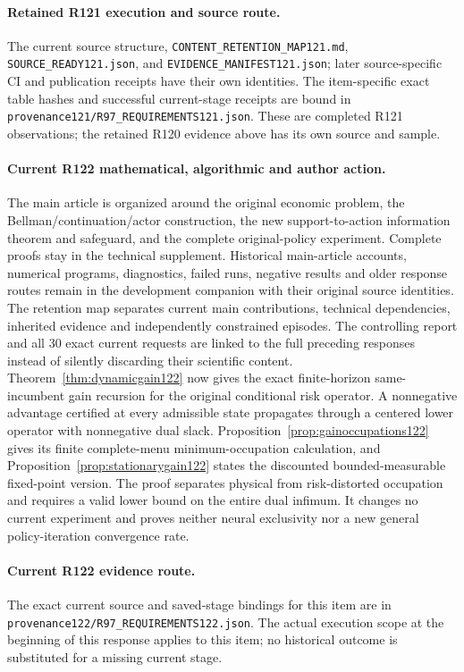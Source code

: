 \paragraph{Retained R121 execution and source route.}
The current source structure, \nolinkurl{CONTENT_RETENTION_MAP121.md}, \nolinkurl{SOURCE_READY121.json}, and \nolinkurl{EVIDENCE_MANIFEST121.json}; later source-specific CI and publication receipts have their own identities.
The item-specific exact table hashes and successful current-stage receipts are bound in \nolinkurl{provenance121/R97_REQUIREMENTS121.json}. These are completed R121 observations; the retained R120 evidence above has its own source and sample.
\paragraph{Current R122 mathematical, algorithmic and author action.}
The main article is organized around the original economic problem, the Bellman/continuation/actor construction, the new support-to-action information theorem and safeguard, and the complete original-policy experiment. Complete proofs stay in the technical supplement. Historical main-article accounts, numerical programs, diagnostics, failed runs, negative results and older response routes remain in the development companion with their original source identities. The retention map separates current main contributions, technical dependencies, inherited evidence and independently constrained episodes. The controlling report and all 30 exact current requests are linked to the full preceding responses instead of silently discarding their scientific content. Theorem~\ref{thm:dynamicgain122} now gives the exact finite-horizon same-incumbent gain recursion for the original conditional risk operator. A nonnegative advantage certified at every admissible state propagates through a centered lower operator with nonnegative dual slack. Proposition~\ref{prop:gainoccupations122} gives its finite complete-menu minimum-occupation calculation, and Proposition~\ref{prop:stationarygain122} states the discounted bounded-measurable fixed-point version. The proof separates physical from risk-distorted occupation and requires a valid lower bound on the entire dual infimum. It changes no current experiment and proves neither neural exclusivity nor a new general policy-iteration convergence rate.
\paragraph{Current R122 evidence route.}
The exact current source and saved-stage bindings for this item are in \nolinkurl{provenance122/R97_REQUIREMENTS122.json}. The actual execution scope at the beginning of this response applies to this item; no historical outcome is substituted for a missing current stage.
